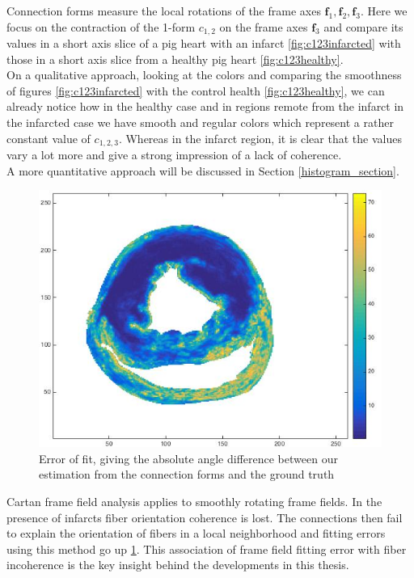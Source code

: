 Connection forms measure the local rotations of the frame axes $\mathbf{f}_1, \mathbf{f}_2, \mathbf{f}_3$. Here we focus on the contraction of the 1-form $c_{1,2}$ on the frame axes $\mathbf{f}_3$ and compare its values in a short axis slice of a pig heart with an infarct \ref{fig:c123infarcted} with those in a short axis slice from a healthy pig heart \ref{fig:c123healthy}.\\
On a qualitative approach, looking at the colors and comparing the smoothness of figures \ref{fig:c123infarcted} with the control health \ref{fig:c123healthy}, we can already notice how in the healthy case and in regions remote from the infarct in the infarcted case we have smooth and regular colors which represent a rather constant value of $c_{1,2,3}$. Whereas in the infarct region, it is clear that the values vary a lot more and give a strong impression of a lack of coherence.\\
A more quantitative approach will be discussed in Section \ref{histogram_section}.
 
 \begin{figure}
     \centering
     \includegraphics[width=\textwidth]{figures/pig4_error_of_fit_slice_19}
     \caption{Error of fit, giving the absolute angle difference between our estimation from the connection forms and the ground truth}
     \label{fig:error_of_fit}
 \end{figure}
 
Cartan frame field analysis applies to smoothly rotating frame fields. In the presence of infarcts fiber orientation coherence is lost. The connections then fail to explain the orientation of fibers in a local neighborhood and fitting errors using this method go up \ref{fig:error_of_fit}. This association of frame field fitting error with fiber incoherence is the key insight behind the developments in this thesis.

